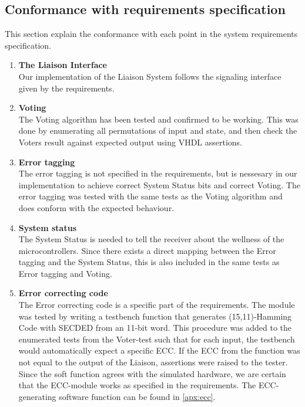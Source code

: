 \subsection{Conformance with requirements specification}
This section explain the conformance with each point in the system requirements specification.
\begin{enumerate}
    \item{\textbf{The Liaison Interface}} \hfill\\
        Our implementation of the Liaison System follows the signaling interface given by the requirements\cite{task}.

    \item{\textbf{Voting}} \hfill\\
        The Voting algorithm has been tested and confirmed to be working. This was done by enumerating all
        permutations of input and state, and then check the Voters result against expected output using
        VHDL assertions.

    \item{\textbf{Error tagging}} \hfill\\
        The error tagging is not specified in the requirements, but is nessesary in our implementation to
        achieve correct System Status bits and correct Voting. The error tagging was tested with the same
        tests as the Voting algorithm and does conform with the expected behaviour.

    \item{\textbf{System status}} \hfill\\
        The System Status is needed to tell the receiver about the wellness of the microcontrollers. Since
        there exists a direct mapping between the Error tagging and the System Status, this is also
        included in the same tests as Error tagging and Voting.

    \item{\textbf{Error correcting code}} \hfill\\
        The Error correcting code is a specific part of the requirements\cite{task}. The module was tested by writing
        a testbench function that generates (15,11)-Hamming Code with SECDED from an 11-bit word. This
        procedure was added to the enumerated tests from the Voter-test such that for each input, the testbench
        would automatically expect a specific ECC. If the ECC from the function was not equal to the output
        of the Liaison, assertions were raised to the tester. Since the soft function agrees with the simulated
        hardware, we are certain that the ECC-module works as specified in the requirements. The ECC-generating
        software function can be found in \autoref{apx:ecc}.


\end{enumerate}
